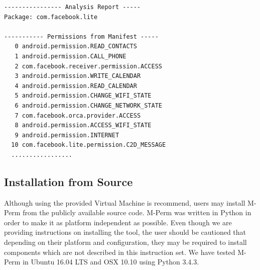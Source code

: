 \documentclass{sig-alternate-05-2015}
\begin{document}
\begin{enumerate}
\begin{lstlisting}[caption=Example M-Perm Output]
---------------- Analysis Report -----
Package: com.facebook.lite

----------- Permissions from Manifest -----
   0 android.permission.READ_CONTACTS
   1 android.permission.CALL_PHONE
   2 com.facebook.receiver.permission.ACCESS
   3 android.permission.WRITE_CALENDAR
   4 android.permission.READ_CALENDAR
   5 android.permission.CHANGE_WIFI_STATE
   6 android.permission.CHANGE_NETWORK_STATE
   7 com.facebook.orca.provider.ACCESS
   8 android.permission.ACCESS_WIFI_STATE
   9 android.permission.INTERNET
  10 com.facebook.lite.permission.C2D_MESSAGE
  .................
\end{lstlisting}
	
	
	
	
\end{enumerate}


\subsection{Installation from Source}

Although using the provided Virtual Machine is recommend, users may install M-Perm from the publicly available source code. M-Perm was written in Python in order to make it as platform independent as possible. Even though we are providing instructions on installing the tool, the user should be cautioned that depending on their platform and configuration, they may be required to install components which are not described in this instruction set. We have tested M-Perm  in Ubuntu 16.04 LTS and OSX 10.10 using Python 3.4.3.
\end{document}
